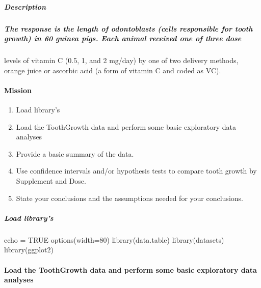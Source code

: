 \documentclass[
]{article}
\newenvironment{Shaded}{\begin{snugshade}}{\end{snugshade}}
\newcommand{\AttributeTok}[1]{\textcolor[rgb]{0.77,0.63,0.00}{#1}}
\newcommand{\ConstantTok}[1]{\textcolor[rgb]{0.00,0.00,0.00}{#1}}
\newcommand{\DecValTok}[1]{\textcolor[rgb]{0.00,0.00,0.81}{#1}}
\newcommand{\FunctionTok}[1]{\textcolor[rgb]{0.00,0.00,0.00}{#1}}
\newcommand{\NormalTok}[1]{#1}
\newcommand{\OtherTok}[1]{\textcolor[rgb]{0.56,0.35,0.01}{#1}}
\providecommand{\tightlist}{%
  \setlength{\itemsep}{0pt}\setlength{\parskip}{0pt}}
\begin{document}
\hypertarget{description}{%
\subparagraph{Description}\label{description}}

\hypertarget{the-response-is-the-length-of-odontoblasts-cells-responsible-for-tooth-growth-in-60-guinea-pigs.-each-animal-received-one-of-three-dose}{%
\subparagraph{The response is the length of odontoblasts (cells
responsible for tooth growth) in 60 guinea pigs. Each animal received
one of three
dose}\label{the-response-is-the-length-of-odontoblasts-cells-responsible-for-tooth-growth-in-60-guinea-pigs.-each-animal-received-one-of-three-dose}}

levels of vitamin C (0.5, 1, and 2 mg/day) by one of two delivery
methods, orange juice or ascorbic acid (a form of vitamin C and coded as
VC).

\hypertarget{mission}{%
\paragraph{Mission}\label{mission}}

\begin{enumerate}
\def\labelenumi{\arabic{enumi}.}
\setcounter{enumi}{-1}
\tightlist
\item
  Load library's
\item
  Load the ToothGrowth data and perform some basic exploratory data
  analyses
\item
  Provide a basic summary of the data.
\item
  Use confidence intervals and/or hypothesis tests to compare tooth
  growth by Supplement and Dose.
\item
  State your conclusions and the assumptions needed for your
  conclusions.
\end{enumerate}

\hypertarget{load-librarys}{%
\subparagraph{Load library's}\label{load-librarys}}

\begin{Shaded}
\begin{Highlighting}[]
\NormalTok{echo }\OtherTok{=} \ConstantTok{TRUE}
\FunctionTok{options}\NormalTok{(}\AttributeTok{width=}\DecValTok{80}\NormalTok{)}
\FunctionTok{library}\NormalTok{(data.table)}
\FunctionTok{library}\NormalTok{(datasets)}
\FunctionTok{library}\NormalTok{(ggplot2)}
\end{Highlighting}
\end{Shaded}

\hypertarget{load-the-toothgrowth-data-and-perform-some-basic-exploratory-data-analyses}{%
\paragraph{Load the ToothGrowth data and perform some basic exploratory
data
analyses}\label{load-the-toothgrowth-data-and-perform-some-basic-exploratory-data-analyses}}
\end{document}
